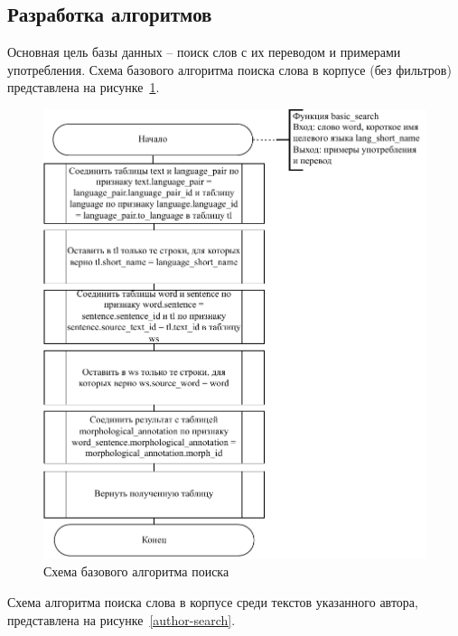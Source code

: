 \subsection{Разработка алгоритмов}

Основная цель базы данных -- поиск слов с их переводом и примерами употребления. 
Схема базового алгоритма поиска слова в корпусе (без фильтров) представлена на рисунке~\ref{basic-search}.

\begin{figure}[ht]
	\centering
	\includegraphics[scale=1]{img/search-algo-basic.pdf}
	\caption{Схема базового алгоритма поиска}
	\label{basic-search}
\end{figure}\clearpage

Схема алгоритма поиска слова в корпусе среди текстов указанного автора, представлена на рисунке~\ref{author-search}.

